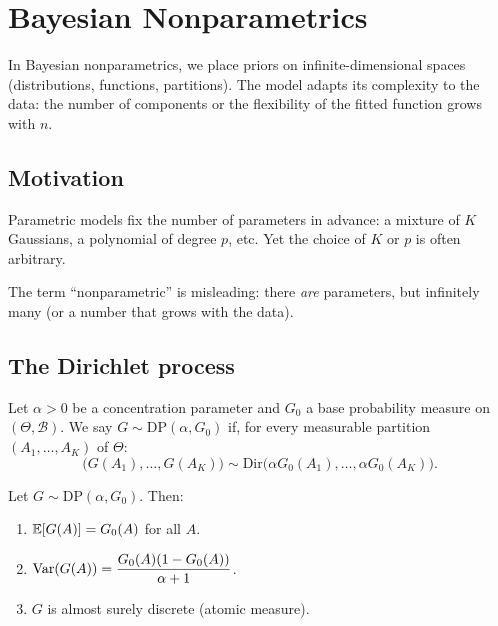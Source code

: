 \chapter{Bayesian Nonparametrics}
\label{ch:nonparametric}

\begin{intuition}[title=\textbf{Central idea}]
In Bayesian nonparametrics, we place priors on infinite-dimensional spaces
(distributions, functions, partitions). The model adapts its complexity to
the data: the number of components or the flexibility of the fitted
function grows with $n$.
\end{intuition}

\section{Motivation}

Parametric models fix the number of parameters in advance: a mixture of
$K$ Gaussians, a polynomial of degree $p$, etc. Yet the choice of $K$ or
$p$ is often arbitrary.

\begin{remark}
The term ``nonparametric'' is misleading: there \emph{are} parameters, but
infinitely many (or a number that grows with the data).
\end{remark}

\section{The Dirichlet process}

\begin{definition}
Let $\alpha > 0$ be a concentration parameter and $G_0$ a base probability
measure on $(\Theta, \mathcal{B})$. We say $G \sim \mathrm{DP}(\alpha, G_0)$
if, for every measurable partition $(A_1, \ldots, A_K)$ of $\Theta$:
\[
  \bigl(G(A_1), \ldots, G(A_K)\bigr) \sim
  \mathrm{Dir}\!\bigl(\alpha G_0(A_1), \ldots, \alpha G_0(A_K)\bigr).
\]
\end{definition}

\begin{proposition}
Let $G \sim \mathrm{DP}(\alpha, G_0)$. Then:
\begin{enumerate}
  \item $\mathbb{E}[G(A)] = G_0(A)$ for all $A$.
  \item $\mathrm{Var}(G(A)) = \dfrac{G_0(A)(1 - G_0(A))}{\alpha + 1}$.
  \item $G$ is almost surely discrete (atomic measure).
\end{enumerate}
\end{proposition}

